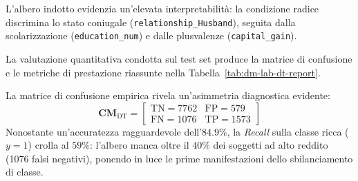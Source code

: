L'albero indotto evidenzia un'elevata interpretabilità: la condizione radice discrimina lo stato coniugale (\texttt{relationship\_Husband}), seguita dalla scolarizzazione (\texttt{education\_num}) e dalle plusvalenze (\texttt{capital\_gain}).

La valutazione quantitativa condotta sul test set produce la matrice di confusione e le metriche di prestazione riassunte nella Tabella~\ref{tab:dm-lab-dt-report}.

\begin{table}[H]
\centering
\caption{Report di classificazione sul test set per l'albero di decisione indotto ($N_{\text{test}} = 10.990$).}
\label{tab:dm-lab-dt-report}
\vspace{2mm}
\end{table}

\noindent
La matrice di confusione empirica rivela un'asimmetria diagnostica evidente:
\begin{equation}
    \mathbf{CM}_{\text{DT}} = \begin{bmatrix} \text{TN} = 7762 & \text{FP} = 579 \\ \text{FN} = 1076 & \text{TP} = 1573 \end{bmatrix}
\end{equation}
Nonostante un'accuratezza ragguardevole dell'$84.9\%$, la \textit{Recall} sulla classe ricca ($y=1$) crolla al $59\%$: l'albero manca oltre il $40\%$ dei soggetti ad alto reddito (1076 falsi negativi), ponendo in luce le prime manifestazioni dello sbilanciamento di classe.

